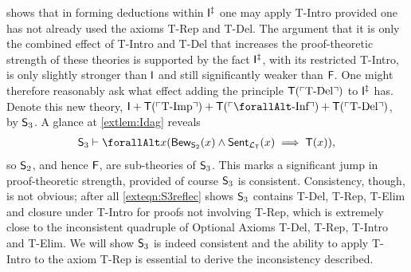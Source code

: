 \documentclass[UKenglish,cleveref,DIV=12]{scrartcl}
\let\forall\forallAlt
\theoremstyle{definition}
\theoremstyle{definition}
\begin{document}
 shows that in forming deductions within $\mathsf{I}^\ddag$ one may
apply T-Intro provided one has not already used the axioms T-Rep and T-Del.
The argument that it is only the combined effect of T-Intro and T-Del that increases the
proof-theoretic strength of these theories is supported by the fact $\mathsf{I}^\ddag$, with its restricted T-Intro, is only slightly stronger than $\mathsf{I}$ and still significantly weaker than $\mathsf{F}$. One might therefore reasonably ask what effect
adding the principle $\mathsf{T}(\ulcorner{\text{T-Del}}\urcorner)$ to $\mathsf{I}^\ddag$ has. Denote this new
theory, $\I+\T(\gn{\text{T-Imp}})+\T(\gn{\text{$\forall$-Inf}})+\T(\gn{\text{T-Del}})$, by $\mathsf{S}_3$. A glance at \cref{extlem:Idag} reveals
\begin{align}\label{exteqn:S3reflec}
  \theory S_3\proves\forall x( \Prov_{\theory S_2}(x)\land\Sent_{\L_\T}(x)\implies \T(x)),
\end{align}
so $\mathsf{S}_2$, and hence $\mathsf{F}$, are sub-theories of $\mathsf{S}_3$. This
marks a significant jump in proof-theoretic strength, provided of course
$\mathsf{S}_3$ is consistent. Consistency, though, is not obvious; after all
\cref{exteqn:S3reflec} shows $\mathsf{S}_3$ contains T-Del, T-Rep, T-Elim and
closure under T-Intro for proofs not involving T-Rep, which is extremely close
to the inconsistent quadruple of Optional Axioms T-Del, T-Rep, T-Intro and T-Elim. We will show $\mathsf{S}_3$ is indeed
consistent and the ability to apply T-Intro to the axiom T-Rep is essential to
derive the inconsistency described.
%
\end{document}
